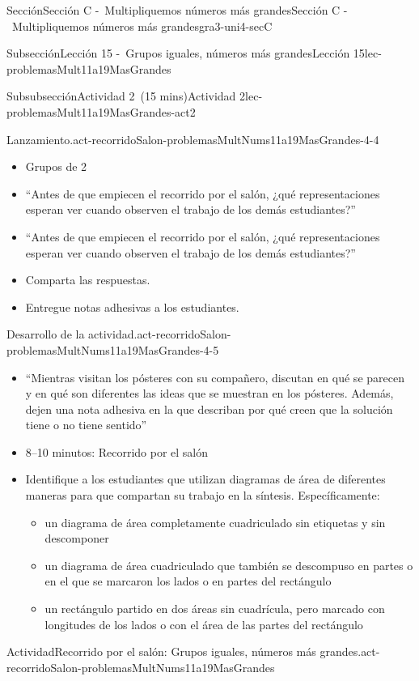 \documentclass[oneside,10pt,]{article}
\begin{document}
\begin{sectionptx}{Sección}{Sección C -~Multipliquemos números más grandes}{}{Sección C -~Multipliquemos números más grandes}{}{}{gra3-uni4-secC}
\begin{subsectionptx}{Subsección}{Lección 15 -~Grupos iguales, números más grandes}{}{Lección 15}{}{}{lec-problemasMult11a19MasGrandes}
\begin{subsubsectionptx}{Subsubsección}{Actividad 2~(15 mins)}{}{Actividad 2}{}{}{lec-problemasMult11a19MasGrandes-act2}
\begin{paragraphs}{Lanzamiento.}{act-recorridoSalon-problemasMultNums11a19MasGrandes-4-4}%
%
\begin{itemize}[label=\textbullet]
\item{}Grupos de 2%
\item{}``Antes de que empiecen el recorrido por el salón, ¿qué representaciones esperan ver cuando observen el trabajo de los demás estudiantes?''%
\item{}``Antes de que empiecen el recorrido por el salón, ¿qué representaciones esperan ver cuando observen el trabajo de los demás estudiantes?''%
\item{}Comparta las respuestas.%
\item{}Entregue notas adhesivas a los estudiantes.%
\end{itemize}
\end{paragraphs}%
\begin{paragraphs}{Desarrollo de la actividad.}{act-recorridoSalon-problemasMultNums11a19MasGrandes-4-5}%
%
\begin{itemize}[label=\textbullet]
\item{}``Mientras visitan los pósteres con su compañero, discutan en qué se parecen y en qué son diferentes las ideas que se muestran en los pósteres. Además, dejen una nota adhesiva en la que describan por qué creen que la solución tiene o no tiene sentido''%
\item{}8–10 minutos: Recorrido por el salón%
\item{}Identifique a los estudiantes que utilizan diagramas de área de diferentes maneras para que compartan su trabajo en la síntesis. Específicamente:%
%
\begin{itemize}[label=$\circ$]
\item{}un diagrama de área completamente cuadriculado sin etiquetas y sin descomponer%
\item{}un diagrama de área cuadriculado que también se descompuso en partes o en el que se marcaron los lados o en partes del rectángulo%
\item{}un rectángulo partido en dos áreas sin cuadrícula, pero marcado con longitudes de los lados o con el área de las partes del rectángulo%
\end{itemize}
\end{itemize}
\end{paragraphs}%
\begin{activity}{Actividad}{Recorrido por el salón: Grupos iguales, números más grandes.}{act-recorridoSalon-problemasMultNums11a19MasGrandes}%

\end{activity}
\end{subsubsectionptx}
\end{subsectionptx}
\end{sectionptx}
\end{document}
